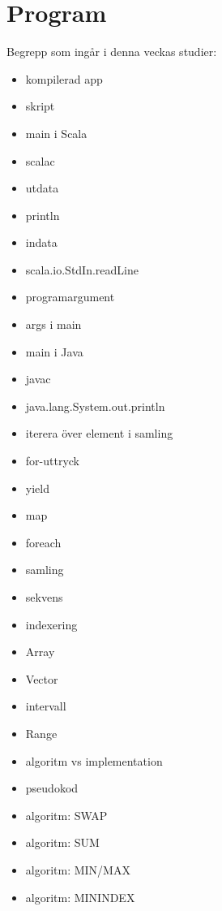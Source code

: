 \chapter{Program}\label{chapter:W02}
Begrepp som ingår i denna veckas studier:
\begin{multicols}{2}\begin{itemize}[noitemsep,label={$\square$},leftmargin=*]
\item kompilerad app
\item skript
\item main i Scala
\item scalac
\item utdata
\item println
\item indata
\item scala.io.StdIn.readLine
\item programargument
\item args i main
\item main i Java
\item javac
\item java.lang.System.out.println
\item iterera över element i samling
\item for-uttryck
\item yield
\item map
\item foreach
\item samling
\item sekvens
\item indexering
\item Array
\item Vector
\item intervall
\item Range
\item algoritm vs implementation
\item pseudokod
\item algoritm: SWAP
\item algoritm: SUM
\item algoritm: MIN/MAX
\item algoritm: MININDEX\end{itemize}\end{multicols}
